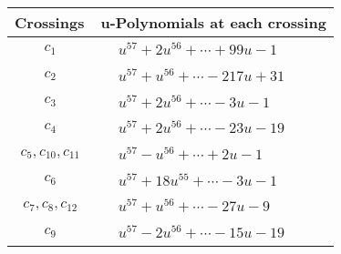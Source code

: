 \documentclass[1p]{elsarticle_modified}
\theoremstyle{definition}
\begin{document}
\begin{tabular}{m{50pt}|m{274pt}}
Crossings & \hspace{64pt}u-Polynomials at each crossing \\
\hline $$\begin{aligned}c_{1}\end{aligned}$$&$\begin{aligned}
&u^{57}+2 u^{56}+\cdots+99 u-1
\end{aligned}$\\
\hline $$\begin{aligned}c_{2}\end{aligned}$$&$\begin{aligned}
&u^{57}+u^{56}+\cdots-217 u+31
\end{aligned}$\\
\hline $$\begin{aligned}c_{3}\end{aligned}$$&$\begin{aligned}
&u^{57}+2 u^{56}+\cdots-3 u-1
\end{aligned}$\\
\hline $$\begin{aligned}c_{4}\end{aligned}$$&$\begin{aligned}
&u^{57}+2 u^{56}+\cdots-23 u-19
\end{aligned}$\\
\hline $$\begin{aligned}c_{5},c_{10},c_{11}\end{aligned}$$&$\begin{aligned}
&u^{57}- u^{56}+\cdots+2 u-1
\end{aligned}$\\
\hline $$\begin{aligned}c_{6}\end{aligned}$$&$\begin{aligned}
&u^{57}+18 u^{55}+\cdots-3 u-1
\end{aligned}$\\
\hline $$\begin{aligned}c_{7},c_{8},c_{12}\end{aligned}$$&$\begin{aligned}
&u^{57}+u^{56}+\cdots-27 u-9
\end{aligned}$\\
\hline $$\begin{aligned}c_{9}\end{aligned}$$&$\begin{aligned}
&u^{57}-2 u^{56}+\cdots-15 u-19
\end{aligned}$\\
\hline
\end{tabular}\\~\\
\end{document}
